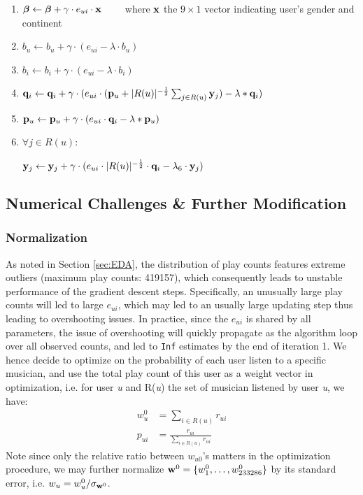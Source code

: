 \documentclass[11pt]{article}
\theoremstyle{definition}
\begin{document}
\begin{enumerate}
\item $\boldsymbol{\beta} \leftarrow \boldsymbol{\beta} + \gamma \cdot e_{ui} \cdot {\bf x}
\qquad $ where ${\bf x}$ the $9 \times 1$ vector indicating user's gender and continent
  \item $b_u \leftarrow b_u+\gamma \cdot(e_{ui}-\lambda \cdot b_u)$
  \item $b_i \leftarrow b_i +\gamma \cdot (e_{ui}-\lambda \cdot b_i)$
  \item ${\bf q}_i \leftarrow {\bf q}_i + \gamma \cdot(e_{ui}\cdot ({\bf p}_u + |R(u)|^{-\frac{1}{2}}\sum_{j \in R(u)}{\bf y}_j)- \lambda*{\bf q}_i)$
  \item ${\bf p}_u \leftarrow {\bf p}_u + \gamma \cdot(e_{ui}\cdot {\bf q}_i - \lambda*{\bf p}_u)$
  \item $\forall  j \in R(u)$:
  
  ${\bf y}_j \leftarrow {\bf y}_j+\gamma \cdot(e_{ui} \cdot|R(u)|^{-\frac{1}{2}} \cdot {\bf q}_i - \lambda_6 \cdot {\bf y}_j)$
\end{enumerate}


\subsection{\textbf{Numerical Challenges \& Further Modification}}

\subsubsection{Normalization}

As noted in Section \ref{sec:EDA}, the distribution of play counts features extreme outliers (maximum play counts: 419157), which consequently leads to unstable performance of the gradient descent steps. Specifically, an unusually large play counts will led to large $e_{ui}$, which may led to an usually large updating step thus leading to overshooting issues. In practice, since the $e_{ui}$ is shared by all parameters, the issue of overshooting will quickly propagate as the algorithm loop over all observed counts, and led to {\tt Inf} estimates by the end of iteration 1. We hence decide to optimize on the probability of each user listen to a specific musician, and use the total play count of this user as a weight vector in optimization, i.e. for user \textit{u} and R(\textit{u}) the set of musician listened by user \textit{u}, we have:
\begin{align*}
w^0_{u} &= \sum_{i \in R(u)} r_{ui}\\
p_{ui} &= \frac{r_{ui}}{\sum_{i \in R(u)} r_{ui}}
\end{align*}
Note since only the relative ratio between $w_{u0}$'s matters in the optimization procedure, we may further normalize ${\bf w}^0 = \{w^0_{1}, \dots, w^0_{233286}\}$ by its standard error, i.e. $w_u = w^0_{u}/\sigma_{{\bf w}^0}$.
\end{document}
